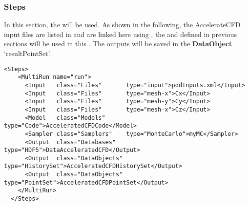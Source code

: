 \subsubsection{Steps}
In this section, the  will be used. As shown in the following, the AccelerateCFD
input files are listed in  and are linked here using , the 
and  defined in previous sections will be used in this . The
outputs will be saved in the \textbf{DataObject} `resultPointSet'.

\begin{lstlisting}[style=XML]
  <Steps>
    <MultiRun name="run">
      <Input   class="Files"       type="input">podInputs.xml</Input>
      <Input   class="Files"       type="mesh-x">Cx</Input>
      <Input   class="Files"       type="mesh-y">Cy</Input>
      <Input   class="Files"       type="mesh-x">Cz</Input>
      <Model   class="Models"      type="Code">AcceleratedCFDCode</Model>
      <Sampler class="Samplers"    type="MonteCarlo">myMC</Sampler>
      <Output  class="Databases"   type="HDF5">DataAcceleratedCFD</Output>
      <Output  class="DataObjects" type="HistorySet">AcceleratedCFDHistorySet</Output>
      <Output  class="DataObjects" type="PointSet">AcceleratedCFDPointSet</Output>
    </MultiRun>
  </Steps>
\end{lstlisting}

